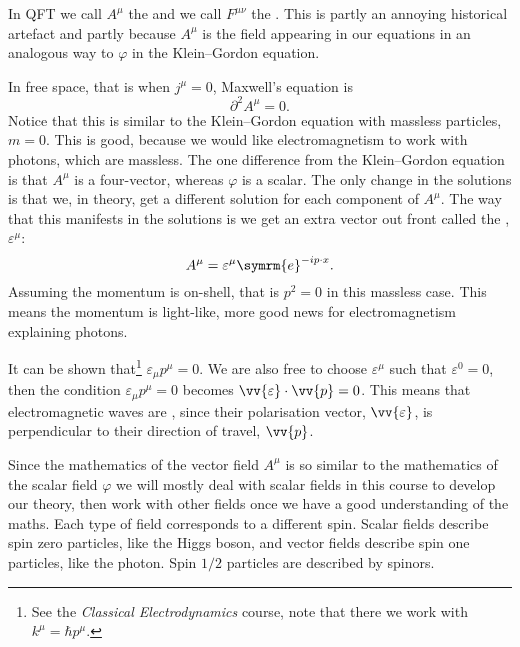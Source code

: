 \documentclass[fleqn]{NotesClass}
\newcommand*{\course}[1]{\textit{#1}}
\newcommand{\dalembertian}{\partial^2}
\newcommand{\e}{\symrm{e}}
\begin{document}
    In QFT we call \(A^\mu\) the  and we call \(F^{\mu\nu}\) the .
    This is partly an annoying historical artefact and partly because \(A^\mu\) is the field appearing in our equations in an analogous way to \(\varphi\) in the Klein--Gordon equation.
    
    In free space, that is when \(j^\mu = 0\), Maxwell's equation is
    \begin{equation}
        \dalembertian A^\mu = 0.
    \end{equation}
    Notice that this is similar to the Klein--Gordon equation with massless particles, \(m = 0\).
    This is good, because we would like electromagnetism to work with photons, which are massless.
    The one difference from the Klein--Gordon equation is that \(A^\mu\) is a four-vector, whereas \(\varphi\) is a scalar.
    The only change in the solutions is that we, in theory, get a different solution for each component of \(A^\mu\).
    The way that this manifests in the solutions is we get an extra vector out front called the , \(\varepsilon^\mu\):
    \begin{equation}
        A^\mu = \varepsilon^\mu \e^{-ip\cdot x}.
    \end{equation}
    Assuming the momentum is on-shell, that is \(p^2 = 0\) in this massless case.
    This means the momentum is light-like, more good news for electromagnetism explaining photons.
    
    It can be shown that\footnote{See the \course{Classical Electrodynamics} course, note that there we work with \(k^\mu = \hbar p^\mu\).} \(\varepsilon_\mu p^\mu = 0\).
    We are also free to choose \(\varepsilon^\mu\) such that \(\varepsilon^0 = 0\), then the condition \(\varepsilon_\mu p^\mu = 0\) becomes \(\vv{\varepsilon} \cdot \vv{p} = 0\).
    This means that electromagnetic waves are , since their polarisation vector, \(\vv{\varepsilon}\), is perpendicular to their direction of travel, \(\vv{p}\).
    
    Since the mathematics of the vector field \(A^\mu\) is so similar to the mathematics of the scalar field \(\varphi\) we will mostly deal with scalar fields in this course to develop our theory, then work with other fields once we have a good understanding of the maths.
    Each type of field corresponds to a different spin.
    Scalar fields describe spin zero particles, like the Higgs boson, and vector fields describe spin one particles, like the photon.
    Spin \(1/2\) particles are described by spinors.
    
\end{document}
